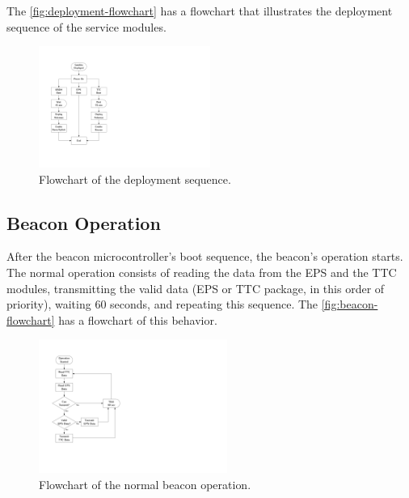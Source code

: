 The \autoref{fig:deployment-flowchart} has a flowchart that illustrates the deployment sequence of the service modules.

\begin{figure}[!htb]
    \begin{center}
        \includegraphics[width=0.5\textwidth]{figures/deployment-flowchart.pdf}
        \caption{Flowchart of the deployment sequence.}
        \label{fig:deployment-flowchart}
    \end{center}
\end{figure}

\subsection{Beacon Operation}

After the beacon microcontroller's boot sequence, the beacon's operation starts. The normal operation consists of reading the data from the EPS and the TTC modules, transmitting the valid data (EPS or TTC package, in this order of priority), waiting 60 seconds, and repeating this sequence. The \autoref{fig:beacon-flowchart} has a flowchart of this behavior.

\begin{figure}[!htb]
    \begin{center}
        \includegraphics[width=0.55\textwidth]{figures/beacon-flowchart.pdf}
        \caption{Flowchart of the normal beacon operation.}
        \label{fig:beacon-flowchart}
    \end{center}
\end{figure}

